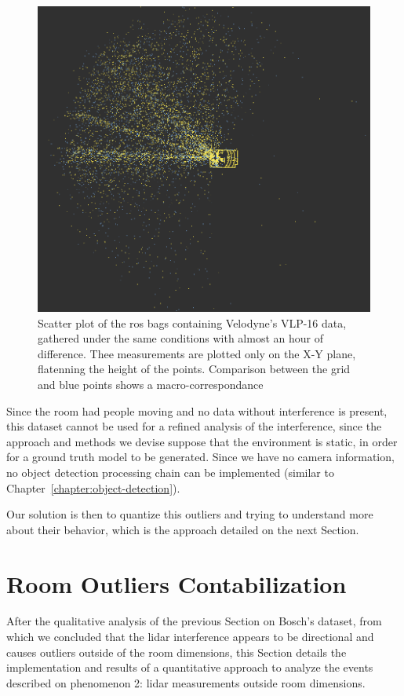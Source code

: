 \begin{figure}[ht!]
	\centering
	\includegraphics[scale=0.33]{img/bosch/vlp16-tests-overlaid.png}
	\caption{Scatter plot of the \ac{ros} bags containing Velodyne's VLP-16 data, gathered under the same conditions with almost an hour of difference. Thee measurements are plotted only on the X-Y plane, flatenning the height of the points. Comparison between the grid and blue points shows a macro-correspondance }
	\label{fig:bosch-vlp16-comparison}
\end{figure}

Since the room had people moving and no data without interference is present, this dataset cannot be used for a refined analysis of the interference, since the approach and methods we devise suppose that the environment is static, in order for a ground truth model to be generated. Since we have no camera information, no object detection processing chain can be implemented (similar to Chapter~\ref{chapter:object-detection}). 

Our solution is then to quantize this outliers and trying to understand more about their behavior, which is the approach detailed on the next Section.


\section{Room Outliers Contabilization}
After the qualitative analysis of the previous Section on Bosch's dataset, from which we concluded that the \ac{lidar} interference appears to be directional and causes outliers outside of the room dimensions, this Section details the implementation and results of a quantitative approach to analyze the events described on phenomenon 2: \ac{lidar} measurements outside room dimensions.

